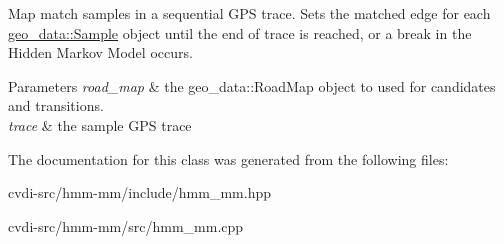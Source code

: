Map match samples in a sequential G\+PS trace. Sets the matched edge for each \hyperlink{classgeo__data_1_1Sample}{geo\+\_\+data\+::\+Sample} object until the end of trace is reached, or a break in the Hidden Markov Model occurs. 


\begin{DoxyParams}{Parameters}
{\em road\+\_\+map} & the geo\+\_\+data\+::\+Road\+Map object to used for candidates and transitions. \\
\hline
{\em trace} & the sample G\+PS trace \\
\hline
\end{DoxyParams}


The documentation for this class was generated from the following files\+:\begin{DoxyCompactItemize}
\item 
cvdi-\/src/hmm-\/mm/include/hmm\+\_\+mm.\+hpp\item 
cvdi-\/src/hmm-\/mm/src/hmm\+\_\+mm.\+cpp\end{DoxyCompactItemize}
